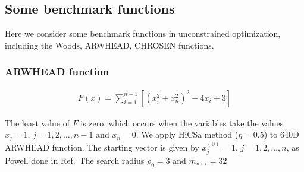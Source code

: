 \documentclass[final,1p,times]{elsarticle}
\begin{document}
\newpage

\subsection{Some benchmark functions}

Here we consider some benchmark functions in unconstrained
optimization, including the Woods, ARWHEAD, CHROSEN functions.

%
%


\subsubsection{ARWHEAD function}
\label{subsec:ARWHEAD}

\begin{align}
	F(x) = \sum_{i=1}^{n-1}[(x_i^2+x_n^2)^2 - 4 x_i +3]
	\label{}
\end{align}

The least value of $F$ is zero, which occurs when the variables take the values
$x_j=1$, $j=1,2,\dots,n-1$ and $x_n=0$. 
We apply HiCSa method
($\eta=0.5$) to 640D ARWHEAD function.
The starting vector is given by $x_j^{(0)}=1$, $j=1,2,\dots,n$, as
Powell done in Ref.\,\cite{powell2006newuoa}
The search radius $\rho_0=3$ and $m_{\max}=32$
\end{document}
